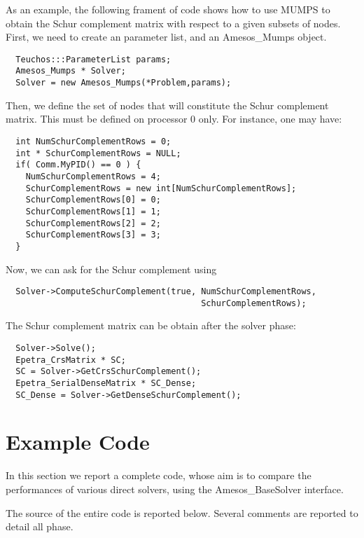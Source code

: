 \documentclass[11pt]{SANDreport}
\begin{document}
As an example, the following frament of code shows how to use MUMPS to
obtain the Schur complement matrix with respect to a given subsets of
nodes.  First, we need to create an parameter list, and an Amesos\_Mumps
object.
\begin{verbatim}
  Teuchos:::ParameterList params;
  Amesos_Mumps * Solver;
  Solver = new Amesos_Mumps(*Problem,params);
\end{verbatim}
Then, we define the set of nodes that will constitute the Schur
complement matrix. This must be defined on processor 0 only. For
instance, one may have:
\begin{verbatim}
  int NumSchurComplementRows = 0;
  int * SchurComplementRows = NULL;
  if( Comm.MyPID() == 0 ) {
    NumSchurComplementRows = 4;
    SchurComplementRows = new int[NumSchurComplementRows];
    SchurComplementRows[0] = 0;
    SchurComplementRows[1] = 1; 
    SchurComplementRows[2] = 2;
    SchurComplementRows[3] = 3;
  }
\end{verbatim}
Now, we can ask for the Schur complement using
\begin{verbatim}  
  Solver->ComputeSchurComplement(true, NumSchurComplementRows,
                                       SchurComplementRows);
\end{verbatim}
The Schur complement matrix can be obtain after the solver phase:  
\begin{verbatim}  
  Solver->Solve();
  Epetra_CrsMatrix * SC;
  SC = Solver->GetCrsSchurComplement();
  Epetra_SerialDenseMatrix * SC_Dense;
  SC_Dense = Solver->GetDenseSchurComplement();
\end{verbatim}




\section{Example Code}
\label{sec:comparison}

In this section we report a complete code, whose aim is to compare the
performances of various direct solvers, using the Amesos\_BaseSolver
interface. 

The source of the entire code is reported below. Several comments are
reported to detail all phase. 
\end{document}
